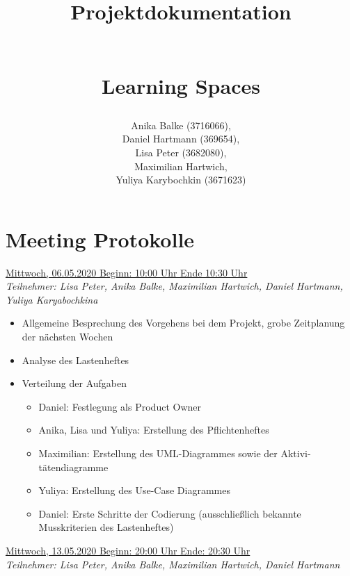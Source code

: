 \documentclass[a4paper,report,headsepline]{scrreprt}
\begin{document}
\title{ \begin{Huge}
\textbf{Projektdokumentation}
\end{Huge} \\  \dq Learning Spaces\dq}
\author{Anika Balke (3716066),\\ Daniel Hartmann (369654),\\ Lisa Peter (3682080), \\ Maximilian Hartwich,\\ Yuliya Karybochkin (3671623)}

\maketitle


\tableofcontents
\clearpage



\chapter{Meeting Protokolle}
\underline{{\large Mittwoch, 06.05.2020 Beginn: 10:00 Uhr Ende 10:30 Uhr}}  \\
\textit{Teilnehmer: Lisa Peter, Anika Balke, Maximilian Hartwich, Daniel Hartmann, Yuliya Karyabochkina}

 \begin{itemize}
  \item Allgemeine Besprechung des Vorgehens bei dem Projekt, grobe Zeitplanung der nächsten Wochen
 \item Analyse des Lastenheftes
 \item Verteilung der Aufgaben
 
 \begin{itemize}
 \item Daniel: Festlegung als Product Owner
 \item Anika, Lisa und Yuliya: Erstellung des Pflichtenheftes
 \item Maximilian: Erstellung des UML-Diagrammes sowie der Aktivi-
 tätendiagramme
 \item Yuliya: Erstellung des Use-Case Diagrammes
 \item Daniel: Erste Schritte der Codierung (ausschließlich bekannte Musskriterien des Lastenheftes)
 
\end{itemize} 
\end{itemize}  
 \underline{{\large Mittwoch, 13.05.2020 Beginn: 20:00 Uhr Ende: 20:30 Uhr}}  \\
\textit{Teilnehmer: Lisa Peter, Anika Balke, Maximilian Hartwich, Daniel Hartmann}
\end{document}
